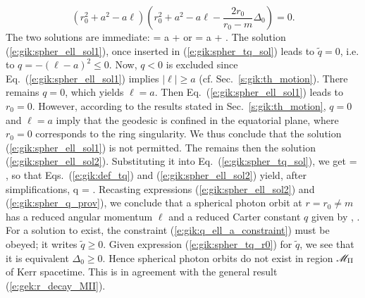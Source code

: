 \[
    (r_0^2 + a^2 - a \ell) \left( r_0^2 + a^2 - a \ell - \frac{2 r_0}{r_0 - m} \Delta_0 \right) = 0 .
\]
The two solutions are immediate:
\be \label{e:gik:spher_ell_sol1}
    \ell = a + 
\ee
or
\be \label{e:gik:spher_ell_sol2}
    \ell = a +   .
\ee
The solution (\ref{e:gik:spher_ell_sol1}), once inserted in (\ref{e:gik:spher_tq_sol})
leads to $\tilde{q} = 0$, i.e. to $q = - (\ell - a)^2 \leq 0$.
Now, $q<0$ is excluded since Eq.~(\ref{e:gik:spher_ell_sol1}) implies $|\ell| \geq a$
(cf. Sec.~\ref{s:gik:th_motion}). There remains $q=0$, which yields $\ell = a$. Then
Eq.~(\ref{e:gik:spher_ell_sol1}) leads to $r_0 = 0$. However, according to the
results stated in Sec.~\ref{s:gik:th_motion}, $q=0$ and $\ell = a$
imply that the geodesic is confined in the equatorial plane, where $r_0=0$
corresponds to the ring singularity. We thus conclude that the solution
(\ref{e:gik:spher_ell_sol1}) is not permitted. The remains then the solution
(\ref{e:gik:spher_ell_sol2}). Substituting it into Eq.~(\ref{e:gik:spher_tq_sol}), we get
\be \label{e:gik:spher_tq_r0}
     =  ,
\ee
so that Eqs.~(\ref{e:gik:def_tq}) and (\ref{e:gik:spher_ell_sol2}) yield, after simplifications,
\be \label{e:gik:spher_q_prov}
    q = \left[ - r_0^3 + 6 m r_0^2 - 9 m^2 r_0 + 4 a^2 m \right] .
\ee
Recasting expressions (\ref{e:gik:spher_ell_sol2}) and (\ref{e:gik:spher_q_prov}), we
conclude that a spherical photon orbit at $r=r_0\neq m$ has a reduced angular momentum $\ell$
and a reduced Carter constant $q$ given by
\be \label{e:gik:spher_ell_r0}
   ,
\ee
\be \label{e:gik:spher_q_r0}
     .
\ee
For a solution to exist, the constraint (\ref{e:gik:q_ell_a_constraint}) must
be obeyed; it writes $\tilde{q} \geq 0$. Given expression (\ref{e:gik:spher_tq_r0}) for
$\tilde{q}$, we see that it is equivalent $\Delta_0 \geq 0$. Hence spherical photon orbits
do not exist in region $\mathscr{M}_{\rm II}$ of Kerr spacetime. This is in agreement with the
general result (\ref{e:gek:r_decay_MII}).

